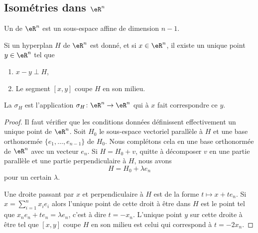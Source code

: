 \subsection{Isométries dans \( \eR^n\)}

\begin{definition}
    Un  de \( \eR^n\) est un sous-espace affine de dimension \( n-1\). 
\end{definition}
    
\begin{lemmaDef}
    Si un hyperplan \( H\) de \( \eR^n\) est donné, et si \( x\in \eR^n\), il existe un unique point \( y\in \eR^n\) tel que
    \begin{enumerate}
        \item
            \( x-y\perp H\),
        \item
            Le segment \( [x,y]\) coupe \( H\) en son milieu.
    \end{enumerate}
    La  \( \sigma_H\) est l'application $\sigma_H\colon \eR^n\to \eR^n $ qui à \( x\) fait correspondre ce \( y\).
\end{lemmaDef}

\begin{proof}
    Il faut vérifier que les conditions données définissent effectivement un unique point de \( \eR^n\). Soit \( H_0\) le sous-espace vectoriel parallèle à \( H\) et une base orthonormée \( \{ e_1,\ldots, e_{n-1} \}\) de \( H_0\). Nous complétons cela en une base orthonormée de \( \eR^n\) avec un vecteur \( e_n\). Si \( H=H_0+v\), quitte à décomposer \( v\) en une partie parallèle et une partie perpendiculaire à \( H\), nous avons
    \begin{equation}
        H=H_0+\lambda e_n
    \end{equation}
    pour un certain \( \lambda\).

    Une droite passant par \( x\) et perpendiculaire à \( H\) est de la forme \( t\mapsto x+te_n\). Si \( x=\sum_{i=1}^{n}x_ie_i\) alors l'unique point de cette droit à être dans \( H\) est le point tel que \(   x_ne_n+te_n=\lambda e_n   \), c'est à dire \( t=-x_n\). L'unique point \( y\) sur cette droite à être tel que \( [x,y ]\) coupe \( H\) en son milieu est celui qui correspond à \( t=-2x_n\). 
\end{proof}

